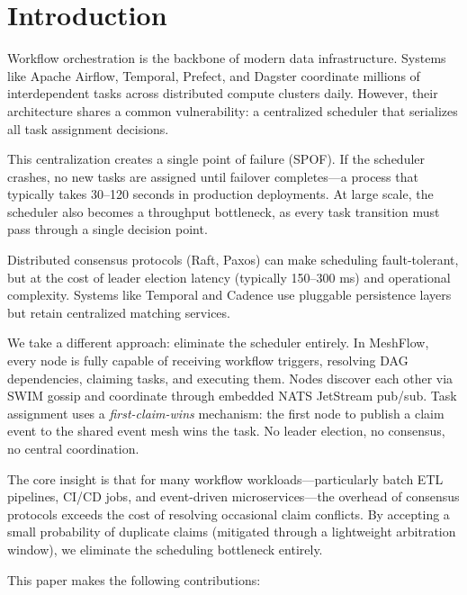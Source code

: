 \section{Introduction}

Workflow orchestration is the backbone of modern data infrastructure. Systems like Apache Airflow, Temporal, Prefect, and Dagster coordinate millions of interdependent tasks across distributed compute clusters daily. However, their architecture shares a common vulnerability: a centralized scheduler that serializes all task assignment decisions.

This centralization creates a single point of failure (SPOF). If the scheduler crashes, no new tasks are assigned until failover completes---a process that typically takes 30--120 seconds in production deployments. At large scale, the scheduler also becomes a throughput bottleneck, as every task transition must pass through a single decision point.

Distributed consensus protocols (Raft, Paxos) can make scheduling fault-tolerant, but at the cost of leader election latency (typically 150--300 ms) and operational complexity. Systems like Temporal and Cadence use pluggable persistence layers but retain centralized matching services.

We take a different approach: eliminate the scheduler entirely. In MeshFlow, every node is fully capable of receiving workflow triggers, resolving DAG dependencies, claiming tasks, and executing them. Nodes discover each other via SWIM gossip and coordinate through embedded NATS JetStream pub/sub. Task assignment uses a \textit{first-claim-wins} mechanism: the first node to publish a claim event to the shared event mesh wins the task. No leader election, no consensus, no central coordination.

The core insight is that for many workflow workloads---particularly batch ETL pipelines, CI/CD jobs, and event-driven microservices---the overhead of consensus protocols exceeds the cost of resolving occasional claim conflicts. By accepting a small probability of duplicate claims (mitigated through a lightweight arbitration window), we eliminate the scheduling bottleneck entirely.

This paper makes the following contributions:


